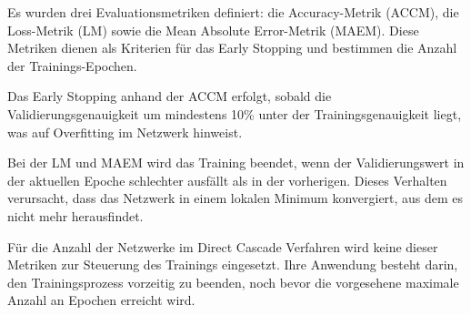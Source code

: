 Es wurden drei Evaluationsmetriken definiert: die Accuracy-Metrik (ACCM), die Loss-Metrik (LM) sowie die Mean Absolute Error-Metrik (MAEM). 
Diese Metriken dienen als Kriterien für das Early Stopping und bestimmen die Anzahl der Trainings-Epochen.

Das Early Stopping anhand der ACCM erfolgt, sobald die Validierungsgenauigkeit um mindestens 10\% unter der 
Trainingsgenauigkeit liegt, was auf Overfitting im Netzwerk hinweist.

Bei der LM und MAEM wird das Training beendet, wenn der Validierungswert in der aktuellen Epoche schlechter ausfällt als in der 
vorherigen. Dieses Verhalten verursacht, dass das Netzwerk in einem lokalen Minimum konvergiert, aus dem es nicht mehr herausfindet.

Für die Anzahl der Netzwerke im Direct Cascade Verfahren wird keine dieser Metriken zur Steuerung des Trainings eingesetzt. 
Ihre Anwendung besteht darin, den Trainingsprozess vorzeitig zu beenden, noch bevor die vorgesehene maximale Anzahl an Epochen erreicht wird. 
